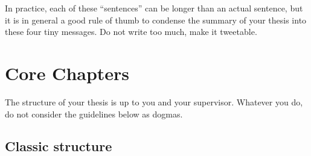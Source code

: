 \documentclass{uvamscse}
\begin{document}
In practice, each of these ``sentences'' can be longer than an actual
sentence, but it is in general a good rule of thumb to condense the summary of
your thesis into these four tiny messages. Do not write too much, make it
tweetable.

\chapter{Core Chapters}

The structure of your thesis is up to you and your supervisor. Whatever you
do, do not consider the guidelines below as dogmas.

\section{Classic structure}
\end{document}
